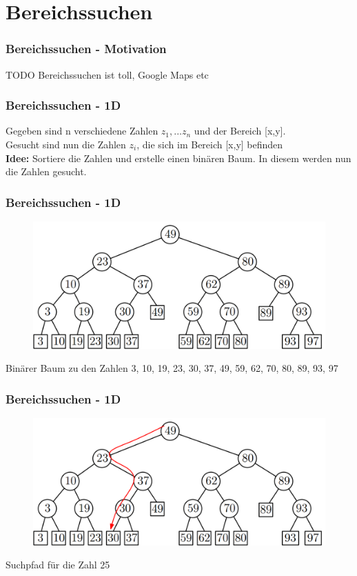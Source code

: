 \section{Bereichssuchen}
\begin{frame}
	\frametitle{Bereichssuchen - Motivation}
	TODO Bereichssuchen ist toll, Google Maps etc
\end{frame}

\begin{frame}
	\frametitle{Bereichssuchen - 1D}
	Gegeben sind n verschiedene Zahlen $z_1, ... z_n$ und der Bereich [x,y].\\
	Gesucht sind nun die Zahlen $z_i$, die sich im Bereich [x,y] befinden \\
	\pause
	\textbf{Idee:} Sortiere die Zahlen und erstelle einen binären Baum. In diesem werden nun die Zahlen gesucht.
\end{frame}

\begin{frame}
	\frametitle{{Bereichssuchen - 1D}}
\begin{figure}[htbp]
	\begin{center}
  	\includegraphics[width=.8\linewidth]{bilder/1d}
	\end{center}
\end{figure}
Binärer Baum zu den Zahlen 3, 10, 19, 23, 30, 37, 49, 59, 62, 70, 80, 89, 93, 97
\end{frame}

\begin{frame}
	\frametitle{{Bereichssuchen - 1D}}
\begin{figure}[htbp]
	\begin{center}
  	\includegraphics[width=.8\linewidth]{bilder/1d2}
	\end{center}
\end{figure}
Suchpfad für die Zahl 25
\end{frame}

